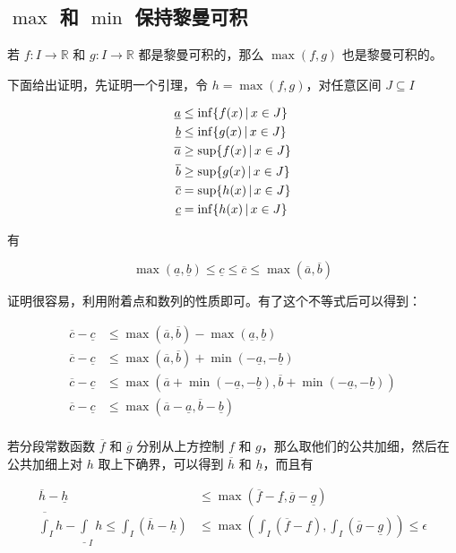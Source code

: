 \subsection{$\max$ 和 $\min$ 保持黎曼可积}

若 $f: I \to \mathbb{R}$ 和 $g: I \to \mathbb{R}$ 都是黎曼可积的，那么 $\max(f,g)$ 也是黎曼可积的。

下面给出证明，先证明一个引理，令 $h = \max(f,g)$，对任意区间 $J \subseteq I $

\begin{align*}
\underline{a} & \le \inf \{ f(x) \,\vert\, x \in J \} \\
\underline{b} & \le \inf \{ g(x) \,\vert\, x \in J \} \\
\overline{a} & \ge \sup \{ f(x) \,\vert\, x \in J \} \\
\overline{b} & \ge \sup \{ g(x) \,\vert\, x \in J \} \\
\overline{c} & = \sup \{ h(x) \,\vert\, x \in J \} \\
\underline{c} & = \inf \{ h(x) \,\vert\, x \in J \} \\
\end{align*}

有

\[
  \max (\underline{a},\underline{b})  \le \underline{c} \le \overline{c} \le \max (\overline{a},\overline{b})
\]

证明很容易，利用附着点和数列的性质即可。有了这个不等式后可以得到：

\begin{align*}
  \overline{c} - \underline{c} & \le \max(\overline{a}, \overline{b}) - \max(\underline{a}, \underline{b}) \\
  \overline{c} - \underline{c} & \le \max(\overline{a}, \overline{b}) + \min(-\underline{a}, -\underline{b}) \\
  \overline{c} - \underline{c} & \le \max(\overline{a} + \min(-\underline{a}, -\underline{b}), \overline{b} + \min(-\underline{a}, -\underline{b})) \\
  \overline{c} - \underline{c} & \le \max(\overline{a} -\underline{a}, \overline{b} -\underline{b}) \\
\end{align*}

若分段常数函数 $\overline{f}$ 和 $\overline{g}$ 分别从上方控制 $f$ 和 $g$，那么取他们的公共加细，然后在公共加细上对 $h$ 取上下确界，可以得到 $\overline{h}$ 和 $\underline{h}$，而且有

\begin{align*}
    \overline{h} - \underline{h} & \le \max(\overline{f} - \underline{f}, \overline{g} - \underline{g}) \\
    \overline{\int}_I h - \underline{\int}_I h \le \int_{I}(\overline{h} - \underline{h}) & \le \max (\int_{I}(\overline{f} - \underline{f}),\int_{I}(\overline{g} - \underline{g}) ) \le \epsilon
\end{align*}

